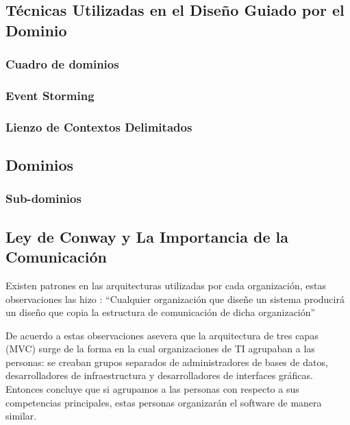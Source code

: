 \subsection{Técnicas Utilizadas en el Diseño Guiado por el Dominio}

\subsubsection{Cuadro de dominios}

\subsubsection{Event Storming}

\subsubsection{Lienzo de Contextos Delimitados}

\subsection{Dominios}

\subsubsection{Sub-dominios}


\subsection{Ley de Conway y La Importancia de la Comunicación}

Existen patrones en las arquitecturas utilizadas por cada organización, estas observaciones
las hizo \cite{conway1968committees}: ``Cualquier organización que diseñe un sistema producirá
un diseño que copia la estructura de comunicación de dicha organización''


De acuerdo a estas observaciones \cite{newman2019monolith} asevera que la arquitectura de tres capas
(MVC) surge de la forma en la cual organizaciones de TI agrupaban a las personas: se creaban grupos
separados de administradores de bases de datos, desarrolladores de infraestructura y desarrolladores
de interfaces gráficas. Entonces concluye que si agrupamos a las personas con respecto a sus competencias
principales, estas personas organizarán el software de manera similar.

